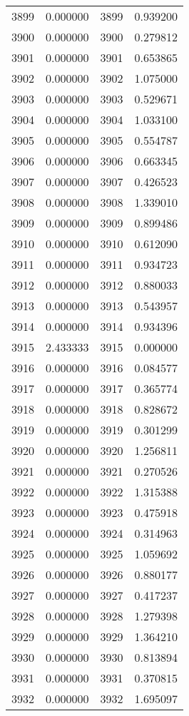 \documentclass[12pt]{article}
\begin{document}
\begin{longtable}{@{}cccc@{}}
3899 & 0.000000 & 3899 & 0.939200 \\
3900 & 0.000000 & 3900 & 0.279812 \\
3901 & 0.000000 & 3901 & 0.653865 \\
3902 & 0.000000 & 3902 & 1.075000 \\
3903 & 0.000000 & 3903 & 0.529671 \\
3904 & 0.000000 & 3904 & 1.033100 \\
3905 & 0.000000 & 3905 & 0.554787 \\
3906 & 0.000000 & 3906 & 0.663345 \\
3907 & 0.000000 & 3907 & 0.426523 \\
3908 & 0.000000 & 3908 & 1.339010 \\
3909 & 0.000000 & 3909 & 0.899486 \\
3910 & 0.000000 & 3910 & 0.612090 \\
3911 & 0.000000 & 3911 & 0.934723 \\
3912 & 0.000000 & 3912 & 0.880033 \\
3913 & 0.000000 & 3913 & 0.543957 \\
3914 & 0.000000 & 3914 & 0.934396 \\
3915 & 2.433333 & 3915 & 0.000000 \\
3916 & 0.000000 & 3916 & 0.084577 \\
3917 & 0.000000 & 3917 & 0.365774 \\
3918 & 0.000000 & 3918 & 0.828672 \\
3919 & 0.000000 & 3919 & 0.301299 \\
3920 & 0.000000 & 3920 & 1.256811 \\
3921 & 0.000000 & 3921 & 0.270526 \\
3922 & 0.000000 & 3922 & 1.315388 \\
3923 & 0.000000 & 3923 & 0.475918 \\
3924 & 0.000000 & 3924 & 0.314963 \\
3925 & 0.000000 & 3925 & 1.059692 \\
3926 & 0.000000 & 3926 & 0.880177 \\
3927 & 0.000000 & 3927 & 0.417237 \\
3928 & 0.000000 & 3928 & 1.279398 \\
3929 & 0.000000 & 3929 & 1.364210 \\
3930 & 0.000000 & 3930 & 0.813894 \\
3931 & 0.000000 & 3931 & 0.370815 \\
3932 & 0.000000 & 3932 & 1.695097 \\

\end{longtable}
\end{document}
